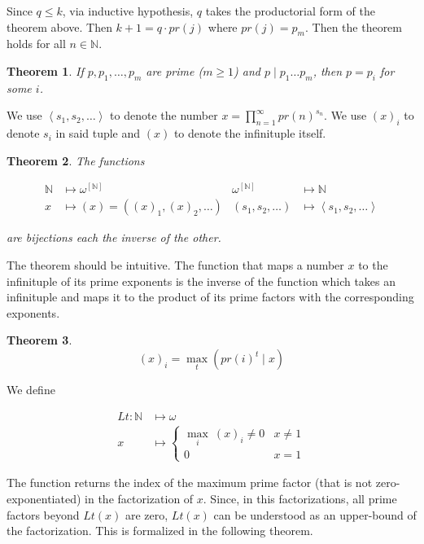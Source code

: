 \documentclass[a4paper, 12pt]{article}
\newtheorem{theorem}{Theorem}
\newtheorem{theorem}{Theorem}
\begin{document}
Since $q \leq k$, via inductive hypothesis, $q$ takes the productorial form of
the theorem above. Then $k + 1 = q \cdot pr(j)$ where $pr(j) = p_m$. Then the
theorem holds for all $n \in \mathbb{N}$.

\begin{theorem}
    If $p, p_1, \ldots, p_m$ are prime ($m \geq 1$) and $p \mid p_1 \ldots p_m$,
    then $p = p_i$ for some $i$.
\end{theorem}

We use $\left\langle  s_1, s_2, \ldots  \right\rangle$ to denote the number $x =
\prod_{n=1}^{\infty} pr(n)^{s_n}$. We use $(x)_i$ to denote $s_i$ in said tuple
and $(x)$ to denote the infinituple itself.

\begin{theorem}
    The functions 

    \begin{align*}
        \mathbb{N} &\mapsto \omega^{[\mathbb{N}]} &
        \omega^{[\mathbb{N}]}&\mapsto \mathbb{N} \\  
        x &\mapsto (x) = \left( (x)_1, (x)_2, \ldots \right) & (s_1, s_2,
        \ldots)&\mapsto \left\langle  s_1, s_2,\ldots  \right\rangle
    \end{align*}

    are bijections each the inverse of the other.
\end{theorem}

The theorem should be intuitive. The function that maps a number $x$ to the
infinituple of its prime exponents is the inverse of the function which takes an
infinituple and maps it to the product of its prime factors with the
corresponding exponents.

\begin{theorem}
    $$(x)_i = \max_{t} \left( pr(i)^{t} \mid x \right) $$
\end{theorem}

We define 

\begin{align*}
    Lt : \mathbb{N} &\mapsto \omega \\ 
    x &\mapsto \begin{cases}
        \max_{i} ~ (x)_i \neq 0 & x \neq 1 \\ 
        0 & x = 1
    \end{cases}
\end{align*}

The function returns the index of the maximum prime factor (that is not
zero-exponentiated) in the factorization of $x$. Since, in this factorizations,
all prime factors beyond $Lt(x)$ are zero, $Lt(x)$ can be understood as an
upper-bound of the factorization. This is formalized in the following theorem.
\end{document}
